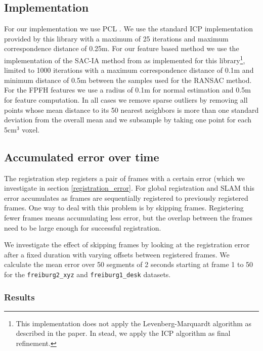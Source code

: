\documentclass[a4paper]{article}
\begin{document}
\subsection{Implementation}

For our implementation we use \ac{PCL} \cite{Rusu_ICRA2011_PCL}. We use the standard \ac{ICP} implementation provided by this library with a maximum of 25 iterations and maximum correspondence distance of 0.25m. For our feature based method we use the implementation of the \ac{SAC-IA} method from \cite{rusu2009fast} as implemented for this library\footnote{This implementation does not apply the Levenberg-Marquardt algorithm as described in the paper. In stead, we apply the \ac{ICP} algorithm as final refinement.}, limited to 1000 iterations with a maximum correspondence distance of 0.1m and minimum distance of 0.5m between the samples used for the \ac{RANSAC} method. For the \ac{FPFH} features we use a radius of 0.1m for normal estimation and 0.5m for feature computation. In all cases we remove sparse outliers by removing all points whose mean distance to its 50 nearest neighbors is more than one standard deviation from the overall mean and we subsample by taking one point for each 5cm$^3$ voxel.





\subsection{Accumulated error over time}
\label{accumulated_error}

The registration step registers a pair of frames with a certain error (which we investigate in section \ref{registration_error}. For global registration and \ac{SLAM} this error accumulates as frames are sequentially registered to previously registered frames. One way to deal with this problem is by skipping frames. Registering fewer frames means accumulating less error, but the overlap between the frames need to be large enough for successful registration. 

We investigate the effect of skipping frames by looking at the registration error after a fixed duration with varying offsets between registered frames. We calculate the mean error over 50 segments of 2 seconds starting at frame 1 to 50 for the \texttt{freiburg2\_xyz} and \texttt{freiburg1\_desk} datasets.

\subsubsection{Results}
\end{document}
